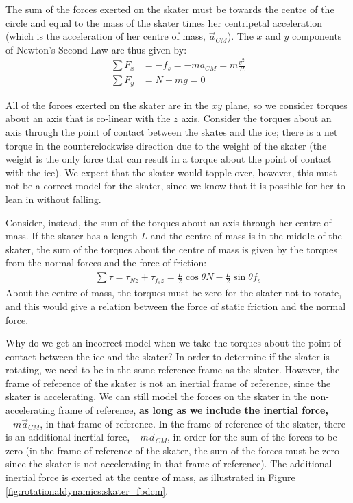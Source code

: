 The sum of the forces exerted on the skater must be towards the centre of the circle and equal to the mass of the skater times her centripetal acceleration (which is the acceleration of her centre of mass, $\vec a_{CM}$). The $x$ and $y$ components of Newton's Second Law are thus given by:
\begin{align*}
\sum F_x &= -f_s = -ma_{CM} = m\frac{v^2}{R}\\
\sum F_y &= N-mg = 0
\end{align*}

All of the forces exerted on the skater are in the $xy$ plane, so we consider torques about an axis that is co-linear with the $z$ axis. Consider the torques about an axis through the point of contact between the skates and the ice; there is a net torque in the counterclockwise direction due to the weight of the skater (the weight is the only force that can result in a torque about the point of contact with the ice). We expect that the skater would topple over, however, this must not be a correct model for the skater, since we know that it is possible for her to lean in without falling. 

Consider, instead, the sum of the torques about an axis through her centre of mass. If the skater has a length $L$ and the centre of mass is in the middle of the skater, the sum of the torques about the centre of mass is given by the torques from the normal forces and the force of friction:
\begin{align*}
\sum \tau = \tau_{Nz} + \tau_{f_sz} = \frac{L}{2}\cos\theta N - \frac{L}{2}\sin\theta f_s
\end{align*}
About the centre of mass, the torques must be zero for the skater not to rotate, and this would give a relation between the force of static friction and the normal force.

Why do we get an incorrect model when we take the torques about the point of contact between the ice and the skater? In order to determine if the skater is rotating, we need to be in the same reference frame as the skater. However, the frame of reference of the skater is not an inertial frame of reference, since the skater is accelerating. We can still model the forces on the skater in the non-accelerating frame of reference, \textbf{as long as we include the inertial force, $-m\vec a_{CM}$}, in that frame of reference. In the frame of reference of the skater, there is an additional inertial force, $-m\vec a_{CM}$, in order for the sum of the forces to be zero (in the frame of reference of the skater, the sum of the forces must be zero since the skater is not accelerating in that frame of reference). The additional inertial force is exerted at the centre of mass, as illustrated in Figure \ref{fig:rotationaldynamics:skater_fbdcm}.

